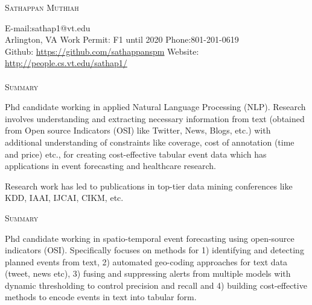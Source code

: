 \documentclass[a4paper]{article}
\newcommand{\lineunder} {\vspace*{-8pt} \\
    \hspace*{-18pt} \hrulefill \\
}
\newcommand{\header} [1] {{\hspace*{-18pt}\vspace*{6pt}\large {\textsc{#1}}}
    \vspace*{-6pt} %
}
\begin{document}

\vspace*{-35pt}

\begin{center}
	{\huge \scshape {Sathappan Muthiah}}\\
\end{center}
\small
E-mail:sathap1@vt.edu\\
Arlington, VA \hfill Work Permit: F1 until 2020 \hfill
Phone:801-201-0619 \\
Github: \url{https://github.com/sathappanspm} \hfill Website:
\url{http://people.cs.vt.edu/sathap1/}  \normalsize \lineunder

%

\header{Summary}

Phd candidate working in applied Natural Language Processing (NLP).
Research involves understanding and extracting necessary information
from text (obtained from Open source Indicators (OSI) like Twitter,
News, Blogs, etc.) with additional understanding of
constraints like coverage, cost of annotation (time and price)
etc., for creating cost-effective tabular event data which has applications in
event forecasting and healthcare research. 

Research work has led to publications in top-tier data mining conferences like KDD, IAAI, IJCAI,
CIKM, etc. 

\iffalse

\header{Summary}

Phd candidate working in spatio-temporal event forecasting using
open-source indicators (OSI). Specifically focuses on methods
for 1) identifying and
detecting planned events from text, 2) automated geo-coding approaches
for text data (tweet, news etc), 3) fusing and suppressing alerts from
multiple models with dynamic thresholding to control precision and
recall and 4) building cost-effective methods to encode events in text
into tabular form.  %
\end{document}
